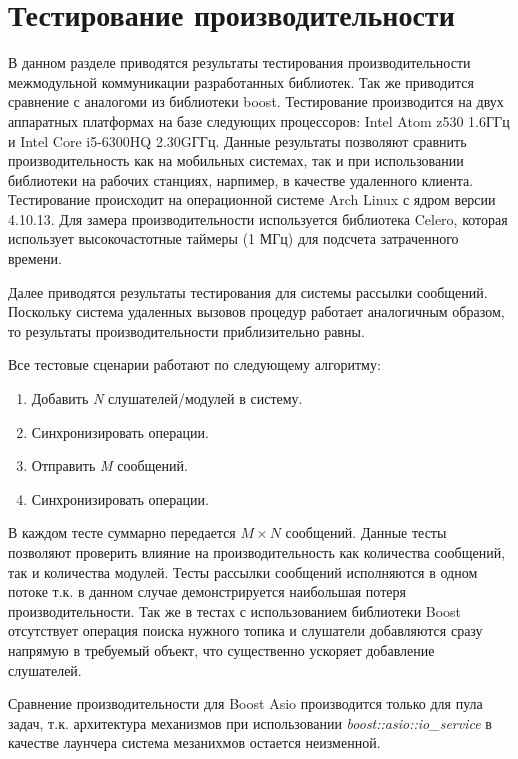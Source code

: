 \section{Тестирование производительности}

В данном разделе приводятся результаты тестирования производительности 
межмодульной коммуникации разработанных библиотек. Так же приводится сравнение 
с аналогоми из библиотеки boost. Тестирование производится на двух аппаратных 
платформах на базе следующих процессоров: Intel Atom z530 1.6ГГц и Intel Core 
i5-6300HQ 2.30GГГц. Данные результаты позволяют сравнить производительность как 
на мобильных системах, так и при использовании библиотеки на рабочих станциях, 
нарпимер, в качестве удаленного клиента. Тестирование происходит на 
операционной системе Arch Linux с ядром версии 4.10.13. Для замера 
производительности используется библиотека Celero, которая использует 
высокочастотные таймеры (1 МГц) для подсчета затраченного времени.

Далее приводятся результаты тестирования для системы рассылки сообщений. Поскольку система удаленных вызовов процедур работает аналогичным образом, то результаты производительности приблизительно равны.

Все тестовые сценарии работают по следующему алгоритму:

\begin{enumerate}
    \item Добавить \textit{N} слушателей/модулей в систему.
    \item Синхронизировать операции.
    \item Отправить \textit{M} сообщений.
    \item Синхронизировать операции.
\end{enumerate}

В каждом тесте суммарно передается $M \times N$ сообщений. Данные тесты 
позволяют проверить влияние на производительность как количества сообщений, так 
и количества модулей. Тесты рассылки сообщений исполняются в одном потоке т.к. 
в данном случае демонстрируется наибольшая потеря производительности. Так же в 
тестах с использованием библиотеки Boost отсутствует операция поиска нужного 
топика и слушатели добавляются сразу напрямую в требуемый объект, что 
существенно ускоряет добавление слушателей.

Сравнение производительности для Boost Asio производится только для пула задач, т.к. архитектура механизмов при использовании \textit{boost::asio::io\_service} в качестве лаунчера система мезанихмов остается неизменной.


